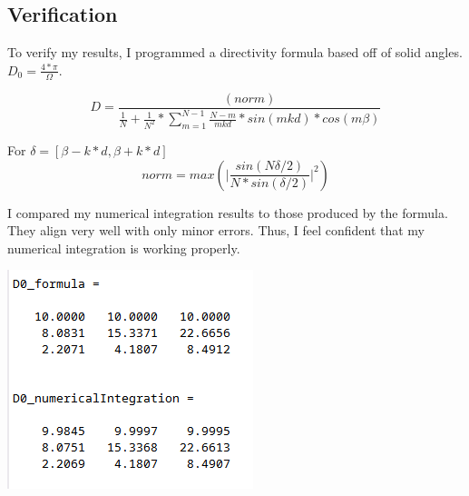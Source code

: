 \subsection{Verification}
To verify my results, I programmed a directivity formula based off of solid angles. $D_0 = \frac{4*\pi}{\Omega}$.

\begin{equation}
	D = \frac{(norm)}{\frac{1}{N} + \frac{1}{N^2}* \sum_{m=1}^{N-1}\frac{N-m}{mkd}*sin(mkd)*cos(m\beta)}
\end{equation}

For	$ \delta = [\beta - k*d , \beta +k*d] $
\begin{equation}
	norm = max(\Bigg|\frac{sin(N\delta/2)}{N*sin( \delta/2)}\Bigg|^2) 
\end{equation}


I compared my numerical integration results to those produced by the formula. They align very well with only minor errors. Thus, I feel confident that my numerical integration is working properly.

\includegraphics[scale=1]{hw4_verification.png}

